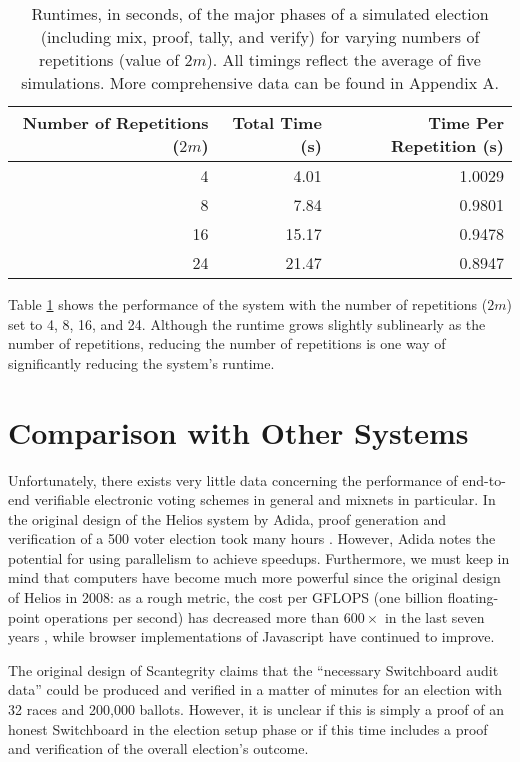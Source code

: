 \begin{table}[htbp]
\centering
\begin{tabular}{r | r | r}
  \textbf{Number of Repetitions ($2m$)} & \textbf{Total Time (s)} & \textbf{Time Per Repetition (s)} \\
  \hline
  4 & 4.01 & 1.0029 \\
  8 & 7.84 & 0.9801 \\
  16 & 15.17 & 0.9478 \\
  24 & 21.47 & 0.8947
\end{tabular}
\caption[Election runtime for varying numbers of repetitions]{Runtimes, in seconds, of the major phases of a simulated election (including mix, proof, tally, and verify) for varying numbers of repetitions (value of $2m$). All timings reflect the average of five simulations. More comprehensive data can be found in Appendix A.}
\label{perf:nreps}
\end{table}

Table \ref{perf:nreps} shows the performance of the system with the number of repetitions ($2m$) set to 4, 8, 16, and 24. Although the runtime grows slightly sublinearly as the number of repetitions, reducing the number of repetitions is one way of significantly reducing the system's runtime.

\section{Comparison with Other Systems} \label{perf:comparison}

Unfortunately, there exists very little data concerning the performance of end-to-end verifiable electronic voting schemes in general and mixnets in particular. In the original design of the Helios system by Adida, proof generation and verification of a 500 voter election took many hours \cite{adida-helios}. However, Adida notes the potential for using parallelism to achieve speedups. Furthermore, we must keep in mind that computers have become much more powerful since the original design of Helios in 2008: as a rough metric, the cost per GFLOPS (one billion floating-point operations per second) has decreased more than $600 \times$ in the last seven years \cite{wiki:flops}, while browser implementations of Javascript have continued to improve.

The original design of Scantegrity \cite{scantegrity} claims that the ``necessary Switchboard audit data'' could be produced and verified in a matter of minutes for an election with 32 races and 200,000 ballots. However, it is unclear if this is simply a proof of an honest Switchboard in the election setup phase or if this time includes a proof and verification of the overall election's outcome.

